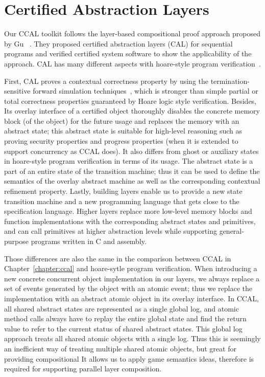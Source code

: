 
\section{Certified Abstraction Layers}

Our CCAL toolkit follows the layer-based compositional proof approach proposed by Gu \etal~\cite{deepspec}.
They proposed certified abstraction layers (CAL) for sequential programs and 
verified certified system software to show the applicability of the approach.
CAL has many different aspects with
 hoare-style program verification~\cite{hoare69,reynolds02,boogie05,nanevski06}.

First, CAL proves a contextual correctness property by using the termination-sensitive forward simulation 
techniques~\cite{Lynch95,compcert}, 
which is stronger than simple partial or total correctness properties guaranteed by Hoare logic style verification.
Besides, Its overlay interface of a certified object thoroughly disables 
the concrete memory block (of the object)  for the future usage 
and replaces the memory with an abstract state;
this abstract state is suitable for high-level reasoning such as proving security properties and progress properties (when it is extended to support
concurrency as CCAL does). 
It also differs from ghost or auxiliary states in hoare-style program verification in terms of 
its usage.
The abstract state is a part of an entire state of the transition machine; 
thus it can be used to define the semantics of the overlay abstract machine
as well as the corresponding contextual refinement property.
Lastly,  building layers enable us to provide a new state transition machine and a new programming language that gets close to the specification language. 
Higher layers replace more low-level memory blocks and function implementations with 
the corresponding abstract states and primitives,
and can call primitives at higher abstraction levels while  
supporting general-purpose
programs written in C and assembly.

Those differences are also the same in the comparison between CCAL in Chapter~\ref{chapter:ccal} and 
hoare-sytle program verification. 
When introducing a new concrete concurrent object implementation in our layers, 
we always replace a set of events generated by the object with an atomic event; thus we replace the implementation with an abstract atomic object in its overlay interface. 
In CCAL, 
all shared abstract states are represented as a single global log,
and atomic method calls always have to 
replay the entire global state and find the return value to refer to the current status of shared abstract states.
This global log approach treats all shared atomic objects with a single log.
Thus this  is seemingly an inefficient way of treating multiple shared atomic objects,
but great for providing compositional 
It allows us to apply game semantics ideas, therefore
is required for supporting parallel layer composition.




